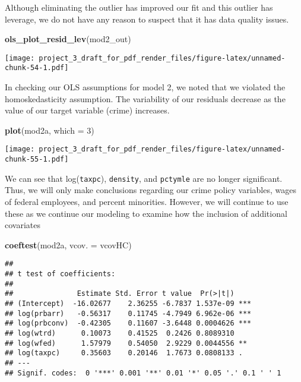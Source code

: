 \documentclass[]{article}
\newenvironment{Shaded}{\begin{snugshade}}{\end{snugshade}}
\newcommand{\DataTypeTok}[1]{\textcolor[rgb]{0.13,0.29,0.53}{#1}}
\newcommand{\DecValTok}[1]{\textcolor[rgb]{0.00,0.00,0.81}{#1}}
\newcommand{\KeywordTok}[1]{\textcolor[rgb]{0.13,0.29,0.53}{\textbf{#1}}}
\newcommand{\NormalTok}[1]{#1}
\begin{document}
Although eliminating the outlier has improved our fit and this outlier
has leverage, we do not have any reason to suspect that it has data
quality issues.

\begin{Shaded}
\begin{Highlighting}[]
\KeywordTok{ols_plot_resid_lev}\NormalTok{(mod2_out)}
\end{Highlighting}
\end{Shaded}

\texttt{[image: project\_3\_draft\_for\_pdf\_render\_files/figure-latex/unnamed-chunk-54-1.pdf]}

In checking our OLS assumptions for model 2, we noted that we violated
the homoskedasticity assumption. The variability of our residuals
decrease as the value of our target variable (crime) increases.

\begin{Shaded}
\begin{Highlighting}[]
\KeywordTok{plot}\NormalTok{(mod2a, }\DataTypeTok{which =} \DecValTok{3}\NormalTok{)}
\end{Highlighting}
\end{Shaded}

\texttt{[image: project\_3\_draft\_for\_pdf\_render\_files/figure-latex/unnamed-chunk-55-1.pdf]}

We can see that log(\texttt{taxpc}), \texttt{density}, and
\texttt{pctymle} are no longer significant. Thus, we will only make
conclusions regarding our crime policy variables, wages of federal
employees, and percent minorities. However, we will continue to use
these as we continue our modeling to examine how the inclusion of
additional covariates

\begin{Shaded}
\begin{Highlighting}[]
\KeywordTok{coeftest}\NormalTok{(mod2a, }\DataTypeTok{vcov. =}\NormalTok{ vcovHC)}
\end{Highlighting}
\end{Shaded}

\begin{verbatim}
## 
## t test of coefficients:
## 
##               Estimate Std. Error t value  Pr(>|t|)    
## (Intercept)  -16.02677    2.36255 -6.7837 1.537e-09 ***
## log(prbarr)   -0.56317    0.11745 -4.7949 6.962e-06 ***
## log(prbconv)  -0.42305    0.11607 -3.6448 0.0004626 ***
## log(wtrd)      0.10073    0.41525  0.2426 0.8089310    
## log(wfed)      1.57979    0.54050  2.9229 0.0044556 ** 
## log(taxpc)     0.35603    0.20146  1.7673 0.0808133 .  
## ---
## Signif. codes:  0 '***' 0.001 '**' 0.01 '*' 0.05 '.' 0.1 ' ' 1
\end{verbatim}
\end{document}
